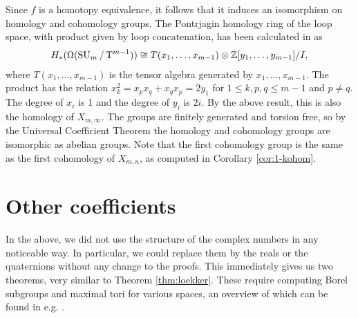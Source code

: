 Since $f$ is a homotopy equivalence, it follows that it induces
an isomorphism on homology and cohomology groups. The Pontrjagin
homology ring of the loop space, with product given by loop
concatenation, has been calculated in \cite[Theorem~4.1]{grbic} as
\begin{align*}
  H_*(\Omega(\operatorname{SU}_{m}/\operatorname{T}^{m-1})) \cong T(x_1,\dots,x_{m-1}) \otimes
  \mathbb{Z}[y_1,\dots,y_{m-1}]/I,
\end{align*}
where $T(x_1,\dots,x_{m-1})$ is the tensor algebra generated by
$x_1,\dots,x_{m-1}$. The product has the relation $x_k^2 =
x_px_q+x_qx_p = 2y_1$ for $1\leq k,p,q\leq m-1$ and $p\neq q$. The
degree of $x_i$ is 1 and the degree of $y_i$
is $2i$. By the above result, this is also the homology of
$X_{m,\infty}$. The groups are finitely generated and torsion free, so
by the Universal Coefficient Theorem the homology and cohomology
groups are isomorphic as abelian groups. Note that the first
cohomology group is the same as the first cohomology of $X_{m,n}$, as
computed in Corollary \ref{cor:1-kohom}.

\section{Other coefficients}
\label{sec:coef}

In the above, we did not use the structure of the complex numbers in
any noticeable way. In particular, we could replace them by the reals
or the quaternions without any change to the proofs. This immediately
gives us two theorems, very similar to Theorem
\ref{thm:loekker}. These require computing Borel subgroups and maximal
tori for various spaces, an overview of which can be found in
e.g. \cite[Example 6.7]{malle}.

